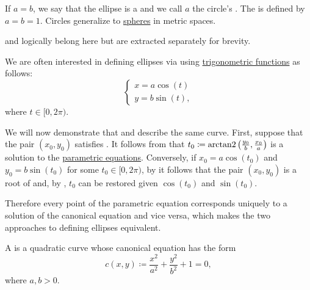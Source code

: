 \begin{Definition}
\begin{DefEnum}
    If \( a = b \), we say that the ellipse is a  and we call \( a \) the circle's . The  is defined by \( a = b = 1 \). Circles generalize to \hyperref[def:metric_space/sphere]{spheres} in metric spaces.

     and  logically belong here but are extracted separately for brevity.

    We are often interested in defining ellipses via  using \hyperref[def:trigonometric_functions]{trigonometric functions} as follows:
    \begin{equation}\label{def:quadratic_plane_curve/ellipse/parametric_equations}
      \begin{cases}
        x = a \cos(t) \\
        y = b \sin(t),
      \end{cases}
    \end{equation}
    where \( t \in [0, 2\pi) \).

    We will now demonstrate that  and  describe the same curve. First, suppose that the pair \( (x_0, y_0) \) satisfies . It follows from  that \( t_0 \coloneqq \operatorname{arctan2}\left(\tfrac {y_0} b, \tfrac {x_0} a \right) \) is a solution to the \hyperref[def:quadratic_plane_curve/ellipse/parametric_equations]{parametric equations}. Conversely, if \( x_0 = a \cos(t_0) \) and \( y_0 = b \sin(t_0) \) for some \( t_0 \in [0, 2\pi) \), by  it follows that the pair \( (x_0, y_0) \) is a root of  and, by , \( t_0 \) can be restored given \( \cos(t_0) \) and \( \sin(t_0) \).

    Therefore every point of the parametric equation  corresponds uniquely to a solution of the canonical equation  and vice versa, which makes the two approaches to defining ellipses equivalent.

     A  is a quadratic curve whose canonical equation has the form
    \begin{equation}\label{def:quadratic_plane_curve/hyperbola/canonical_equation}
      c(x, y) \coloneqq \frac {x^2} {a^2} + \frac {y^2} {b^2} + 1 = 0,
    \end{equation}
    where \( a, b > 0 \).


\end{DefEnum}
\end{Definition}
